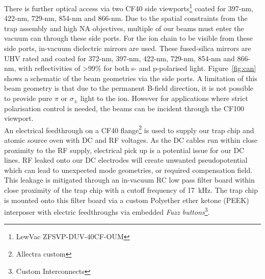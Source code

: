     There is further optical access via
    two CF40 side viewports\footnote{LewVac ZFSVP-DUV-40CF-OUM} coated
    for 397-nm, 422-nm, 729-nm, 854-nm and 866-nm.  Due to the spatial
    constraints from the trap assembly and high NA objectives, 
    multiple of our beams must enter the vacuum can through these side ports. For the ion chain to be visible from these side ports, in-vacuum dielectric
    mirrors are used. These fused-silica mirrors are UHV rated and coated for 372-nm, 397-nm,
    422-nm, 729-nm, 854-nm and 866-nm, with reflectivities of >99\% for both s-
    and p-polarised light. Figure~\ref{fig:can} shows a schematic of the beam
    geometries via the side ports. A limitation of this beam geometry is that due to the permanent B-field direction, it is not possible to provide pure $\pi$ or $\sigma_{\pm}$ light to the ion. However for applications where strict polarisation control is needed, the beams can be incident through the CF100 viewport.\\
    An electrical feedthrough on a CF40 flange\footnote{Allectra custom} is used to supply our trap chip and atomic source oven with DC and RF voltages. As
    the DC cables run within close proximity to the RF supply, electrical pick
    up is a potential issue for our DC lines. RF leaked onto our DC electrodes
    will create unwanted pseudopotential which can lead to unexpected mode
    geometries, or required compensation field. This leakage is mitigated through
    an in-vacuum RC low pass filter board within close proximity of the trap
    chip with a cutoff frequency of 17~kHz. The trap chip is mounted onto this
    filter board via a custom Polyether ether ketone (PEEK) interposer with
    electric feedthroughs via embedded \emph{Fuzz buttons}\footnote{Custom
    Interconnects}. \\

